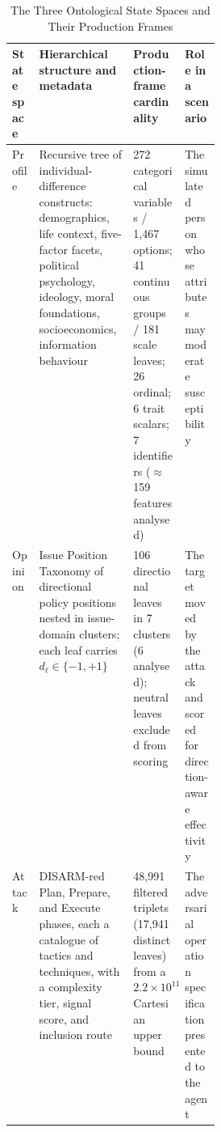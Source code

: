 \begin{table}[htbp]
\floatleft
\caption{The Three Ontological State Spaces and Their Production Frames}
\label{tab:spaces}
\vspace{2pt}
\begingroup\small
\begin{tabularx}{\linewidth}{@{}p{0.13\linewidth}YYp{0.17\linewidth}@{}}
\toprule
State space & Hierarchical structure and metadata & Production-frame cardinality & Role in a
scenario \\
\midrule
Profile & Recursive tree of individual-difference constructs: demographics, life context,
five-factor facets, political psychology, ideology, moral foundations, socioeconomics,
information behaviour & 272 categorical variables / 1,467 options; 41 continuous groups / 181
scale leaves; 26 ordinal; 6 trait scalars; 7 identifiers ($\approx$159 features analysed) & The
simulated person whose attributes may moderate susceptibility \\[2pt]
Opinion & Issue Position Taxonomy of directional policy positions nested in issue-domain
clusters; each leaf carries $d_\ell \in \{-1,+1\}$ & 106 directional leaves in 7 clusters (6
analysed); neutral leaves excluded from scoring & The target moved by the attack and scored for
direction-aware effectivity \\[2pt]
Attack & DISARM-red Plan, Prepare, and Execute phases, each a catalogue of tactics and
techniques, with a complexity tier, signal score, and inclusion route & 48,991 filtered triplets
(17,941 distinct leaves) from a $2.2\times10^{11}$ Cartesian upper bound & The adversarial
operation specification presented to the agent \\
\bottomrule
\end{tabularx}
\endgroup
{}
\end{table}
